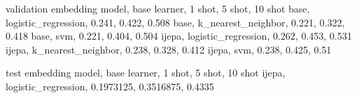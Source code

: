 validation
embedding model, base learner, 1 shot, 5 shot, 10 shot
base, logistic_regression, 0.241, 0.422, 0.508
base, k_nearest_neighbor, 0.221, 0.322, 0.418
base, svm, 0.221, 0.404, 0.504
ijepa, logistic_regression, 0.262, 0.453, 0.531
ijepa, k_nearest_neighbor, 0.238, 0.328, 0.412
ijepa, svm, 0.238, 0.425, 0.51

test 
embedding model, base learner, 1 shot, 5 shot, 10 shot
ijepa, logistic_regression, 0.1973125, 0.3516875, 0.4335
